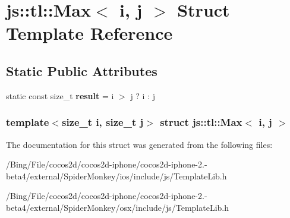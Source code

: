 \hypertarget{structjs_1_1tl_1_1_max}{\section{js\-:\-:tl\-:\-:Max$<$ i, j $>$ Struct Template Reference}
\label{structjs_1_1tl_1_1_max}
}
\subsection*{Static Public Attributes}
\begin{DoxyCompactItemize}
\item 
\hypertarget{structjs_1_1tl_1_1_max_a41826671d9681c9f75d8e7a0fedd3af1}{static const size\-\_\-t {\bfseries result} = i $>$ j ? i \-: j}\label{structjs_1_1tl_1_1_max_a41826671d9681c9f75d8e7a0fedd3af1}

\end{DoxyCompactItemize}
\subsubsection*{template$<$size\-\_\-t i, size\-\_\-t j$>$ struct js\-::tl\-::\-Max$<$ i, j $>$}



The documentation for this struct was generated from the following files\-:\begin{DoxyCompactItemize}
\item 
/\-Bing/\-File/cocos2d/cocos2d-\/iphone/cocos2d-\/iphone-\/2.-\/beta4/external/\-Spider\-Monkey/ios/include/js/Template\-Lib.\-h\item 
/\-Bing/\-File/cocos2d/cocos2d-\/iphone/cocos2d-\/iphone-\/2.-\/beta4/external/\-Spider\-Monkey/osx/include/js/Template\-Lib.\-h\end{DoxyCompactItemize}
